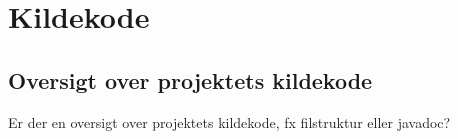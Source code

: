 \chapter{Kildekode}

\section{Oversigt over projektets kildekode }
Er der en oversigt over projektets kildekode, fx filstruktur eller javadoc?